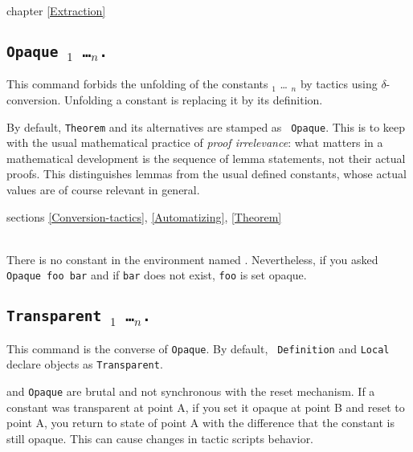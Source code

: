 \begin{ErrMsgs}
\item {}
\end{ErrMsgs}

\SeeAlso chapter \ref{Extraction}

\subsection{\tt Opaque \ident$_1$ \dots \ident$_n$.}
\label{Opaque}
This command forbids the unfolding of the constants \ident$_1$ \dots
\ident$_n$  by tactics using $\delta$-conversion. Unfolding a constant
is replacing it by its definition.

By default, {\tt Theorem} and its alternatives are stamped as {\tt
  Opaque}. This is to keep with the usual mathematical practice of
{\em proof irrelevance}: what matters in a mathematical development is
the sequence of lemma statements, not their actual proofs. This
distinguishes lemmas from the usual defined constants, whose actual
values are of course relevant in general.

\SeeAlso sections \ref{Conversion-tactics}, \ref{Automatizing},
\ref{Theorem}

\begin{ErrMsgs}
\item \ident\ \\
    There is no constant in the environment named
    \ident. Nevertheless, if you asked \texttt{Opaque foo bar}
    and if \texttt{bar} does not exist, \texttt{foo} is set opaque.
\end{ErrMsgs}

\subsection{\tt Transparent \ident$_1$ \dots \ident$_n$.}
\label{Transparent}
This command is the converse of {\tt Opaque}. By default, {\tt
  Definition} and {\tt Local} declare objects as {\tt Transparent}.

 and \texttt{Opaque} are brutal and 
not synchronous
with the reset mechanism. If a constant was transparent at point A, if
you set it opaque at point B and reset to point A, you return to state
of point A with the difference that the constant is still opaque. This
can cause changes in tactic scripts behavior.


